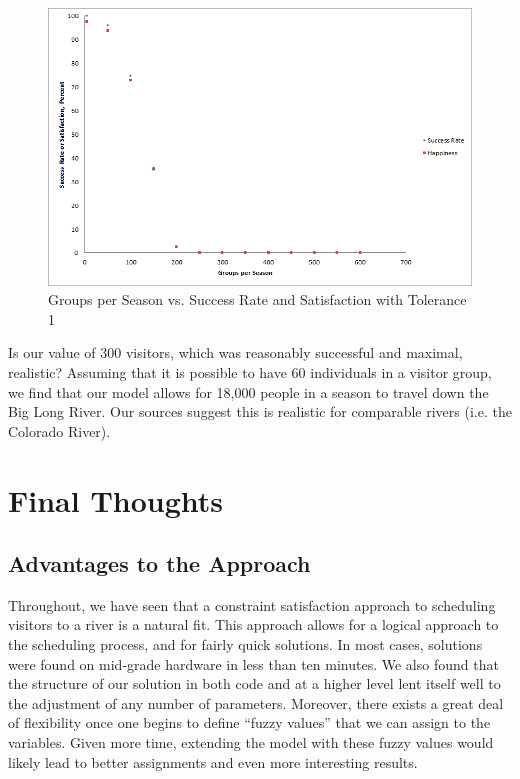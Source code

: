 \documentclass[11pt]{article} %
\begin{document}
\begin{figure}[h]
  \centering
  \includegraphics[scale=.6]{imgs/Graph_VistorsChanges_Tolerance1.png}
  \caption{Groups per Season vs. Success Rate and Satisfaction with Tolerance 1}
  \label{fig:visitors-t1}
\end{figure}

Is our value of 300 visitors, which was reasonably successful and maximal,
realistic?  Assuming that it is possible to have 60 individuals in a visitor
group, we find that our model allows for 18,000 people in a season to travel
down the Big Long River.  Our sources suggest this is realistic for
comparable rivers (i.e. the Colorado River)\cite{ColoradoRiverPaper}.

\section{Final Thoughts}
\label{sec:conclusions}
\subsection{Advantages to the Approach}
\label{sec:pros}
Throughout, we have seen that a constraint satisfaction approach to scheduling
visitors to a river is a natural fit.  This approach allows for a logical
approach to the scheduling process, and for fairly quick solutions.  In most
cases, solutions were found on mid-grade hardware in less than ten minutes.
We also found that the structure of our solution in both code and at a
higher level lent itself well to the adjustment of any number of parameters.
Moreover, there exists a great deal of flexibility once one begins to define
``fuzzy values'' that we can assign to the variables.  Given more time,
extending the model with these fuzzy values would likely lead to better
assignments and even more interesting results.
\end{document}
